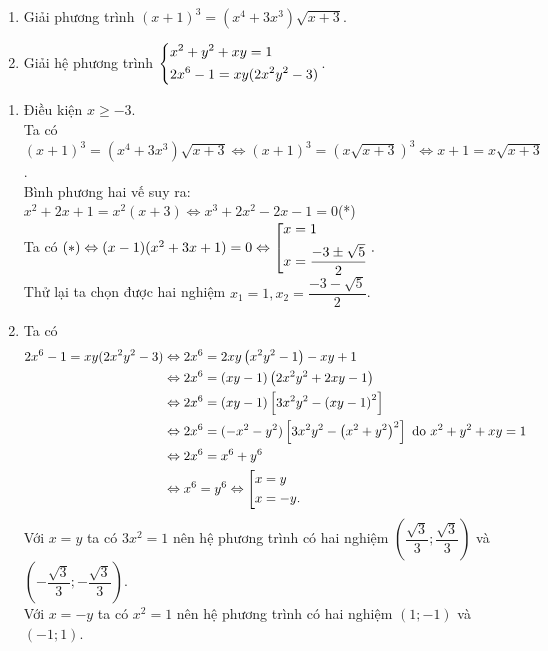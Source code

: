 \begin{ex}%
   \hfill
    \begin{enumerate}
        \item Giải phương trình $(x+1)^{3}=(x^{4}+3x^{3})\sqrt{x+3}$.
        \item Giải hệ phương trình $\left\{\begin{aligned}&x^{2}+y^{2}+xy=1 \\ &2x^{6}-1=xy(2x^{2}y^{2}-3)\end{aligned}\right.$.
    \end{enumerate}
\loigiai
    {
    \begin{enumerate}
        \item Điều kiện $x\geq -3$.\\
        Ta có $(x+1)^{3}=(x^{4}+3x^{3})\sqrt{x+3}\Leftrightarrow (x+1)^{3}=\left(x\sqrt{x+3}\right)^3\Leftrightarrow x+1=x\sqrt{x+3}$.\\
        Bình phương hai vế suy ra: $x^2+2x+1=x^2(x+3) \Leftrightarrow x^3+2x^2-2x-1=0$\hfill (*)\\
        Ta có $(*)\Leftrightarrow (x-1)(x^2+3x+1)=0 \Leftrightarrow \left[\begin{aligned}&x=1\\&x=\dfrac{-3\pm \sqrt{5}}{2}\end{aligned}\right..$\\
        Thử lại ta chọn được hai nghiệm $x_1=1, x_2=\dfrac{-3- \sqrt{5}}{2}$.
        \item Ta có
        \begin{align*}
          2x^{6}-1=xy(2x^{2}y^{2}-3)&\Leftrightarrow  2x^6=2xy\left(x^2y^2-1\right)-xy+1\\
          &\Leftrightarrow 2x^6=(xy-1)\left(2x^2y^2+2xy-1\right)\\
          &\Leftrightarrow 2x^6=(xy-1)\left[3x^2y^2-\left(xy-1\right)^2\right]\\
         &\Leftrightarrow 2x^6=(-x^2-y^2)\left[3x^2y^2-\left(x^2+y^2\right)^2\right] \text{ do } x^{2}+y^{2}+xy=1\\
         &\Leftrightarrow 2x^6=x^6+y^6\\
         &\Leftrightarrow x^6=y^6 \Leftrightarrow \left[\begin{aligned}&x=y\\&x=-y.\end{aligned}\right.
      \end{align*}
      Với $x=y$ ta có $3x^2=1$ nên hệ phương trình có hai nghiệm $\left(\dfrac{\sqrt{3}}{3};\dfrac{\sqrt{3}}{3}\right)$ và  $\left(-\dfrac{\sqrt{3}}{3};-\dfrac{\sqrt{3}}{3}\right)$.\\
        Với $x=-y$ ta có $x^2=1$ nên hệ phương trình có hai nghiệm $\left(1;-1\right)$ và  $\left(-1;1\right)$.
      \end{enumerate}
    }
\end{ex}

